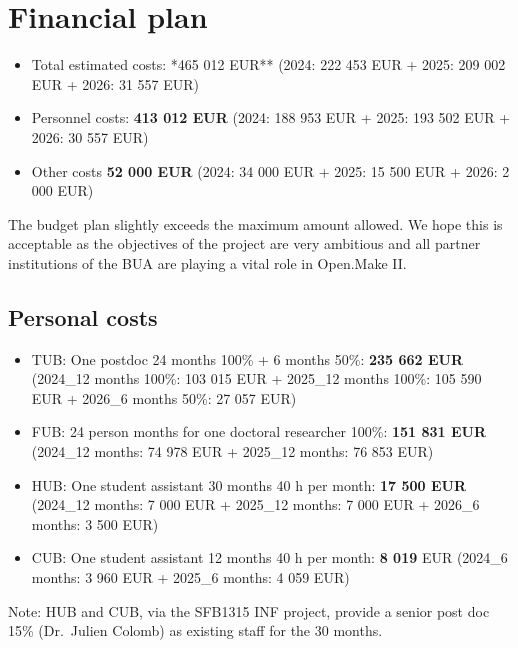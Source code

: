 \documentclass[
  12pt,
  a4paper,
]{article}
\providecommand{\tightlist}{%
  \setlength{\itemsep}{0pt}\setlength{\parskip}{0pt}}
\begin{document}
\newpage

\hypertarget{financial-plan}{%
\section{Financial plan}\label{financial-plan}}

\begin{itemize}
\tightlist
\item
  Total estimated costs: *465 012 EUR** (2024: 222 453 EUR + 2025: 209
  002 EUR + 2026: 31 557 EUR)
\item
  Personnel costs: \textbf{413 012 EUR} (2024: 188 953 EUR + 2025: 193
  502 EUR + 2026: 30 557 EUR)
\item
  Other costs \textbf{52 000 EUR} (2024: 34 000 EUR + 2025: 15 500 EUR +
  2026: 2 000 EUR)
\end{itemize}

The budget plan slightly exceeds the maximum amount allowed. We hope
this is acceptable as the objectives of the project are very ambitious
and all partner institutions of the BUA are playing a vital role in
Open.Make II.

\hypertarget{personal-costs}{%
\subsection{Personal costs}\label{personal-costs}}

\begin{itemize}
\tightlist
\item
  TUB: One postdoc 24 months 100\% + 6 months 50\%: \textbf{235 662 EUR}
  (2024\_12 months 100\%: 103 015 EUR + 2025\_12 months 100\%: 105 590
  EUR + 2026\_6 months 50\%: 27 057 EUR)
\item
  FUB: 24 person months for one doctoral researcher 100\%: \textbf{151
  831 EUR} (2024\_12 months: 74 978 EUR + 2025\_12 months: 76 853 EUR)
\item
  HUB: One student assistant 30 months 40 h per month: \textbf{17 500
  EUR} (2024\_12 months: 7 000 EUR + 2025\_12 months: 7 000 EUR +
  2026\_6 months: 3 500 EUR)
\item
  CUB: One student assistant 12 months 40 h per month: \textbf{8 019}
  EUR (2024\_6 months: 3 960 EUR + 2025\_6 months: 4 059 EUR)
\end{itemize}

Note: HUB and CUB, via the SFB1315 INF project, provide a senior post
doc 15\% (Dr.~Julien Colomb) as existing staff for the 30 months.
\end{document}
